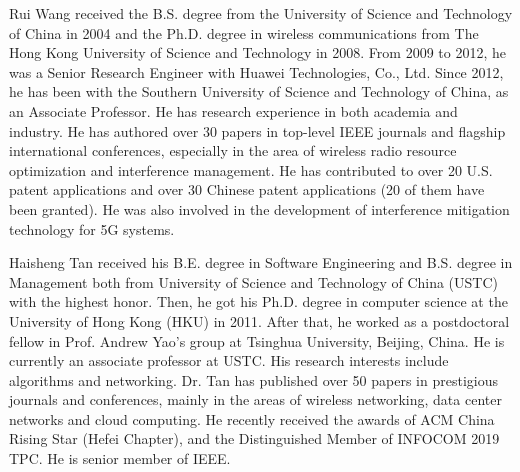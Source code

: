 \begin{IEEEbiography}{Rui Wang}
    received the B.S. degree from the University of Science and Technology of China in 2004 and the Ph.D. degree in wireless communications from The Hong Kong University of Science and Technology in 2008.
    From 2009 to 2012, he was a Senior Research Engineer with Huawei Technologies, Co., Ltd. Since 2012, he has been with the Southern University of Science and Technology of China, as an Associate Professor. He has research experience in both academia and industry. He has authored over 30 papers in top-level IEEE journals and flagship international conferences, especially in the area of wireless radio resource optimization and interference management. He has contributed to over 20 U.S. patent applications and over 30 Chinese patent applications (20 of them have been granted). He was also involved in the development of interference mitigation technology for 5G systems.
\end{IEEEbiography}
\vspace{-1cm}

\begin{IEEEbiography}{Haisheng Tan}
    received his B.E. degree in Software Engineering and B.S. degree in Management both from University of Science and Technology of China (USTC) with the highest honor. Then, he got his Ph.D. degree in computer science at the University of Hong Kong (HKU) in 2011. After that, he worked as a postdoctoral fellow in Prof. Andrew Yao's group at Tsinghua University, Beijing, China. He is currently an associate professor at USTC. His research interests include algorithms and networking. Dr. Tan has published over 50 papers in prestigious journals and conferences, mainly in the areas of wireless networking, data center networks and cloud computing. He recently received the awards of ACM China Rising Star (Hefei Chapter), and the Distinguished Member of INFOCOM 2019 TPC. He is senior member of IEEE.
\end{IEEEbiography}
\vspace{-1cm}

